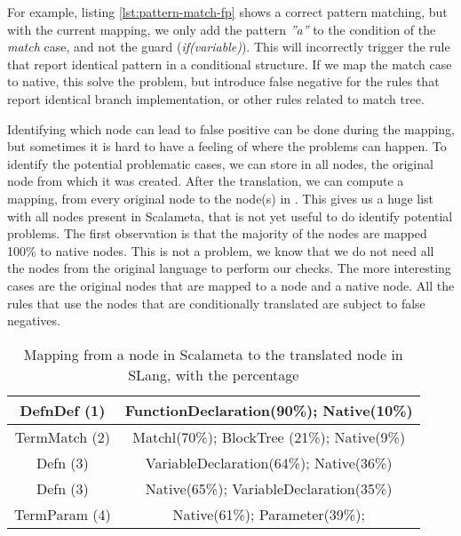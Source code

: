 

For example, listing \ref{lst:pattern-match-fp} shows a correct pattern matching, but with the current mapping, we only add the pattern \emph{”a”} to the condition of the \emph{match} case, and not the guard (\emph{if(variable)}). 
This will incorrectly trigger the rule that report identical pattern in a conditional structure. 
If we map the match case to native, this solve the problem, but introduce false negative for the rules that report identical branch implementation, or other rules related to match tree.

Identifying which node can lead to false positive can be done during the mapping, but sometimes it is hard to have a feeling of where the problems can happen. 
To identify the potential problematic cases, we can store in all nodes, the original node from which it was created. 
After the translation, we can compute a mapping, from every original node to the node(s) in \slang. 
This gives us a huge list with all nodes present in Scalameta, that is not yet useful to do identify potential problems. 
The first observation is that the majority of the nodes are mapped 100\% to native nodes. This is not a problem, we know that we do not need all the nodes from the original language to perform our checks. 
The more interesting cases are the original nodes that are mapped to a \slang{} node and a native node. 
All the rules that use the nodes that are conditionally translated are subject to false negatives.

\begin{table}[h]
	\centering
	\caption{Mapping from a node in Scalameta to the translated node in SLang, with the percentage}
	\label{table:interesting_mapping}
	\begin{tabular}{|c|c|}
		\hline
		DefnDef (1) &  FunctionDeclaration(90\%); Native(10\%) \\ \hline
		TermMatch (2) &  Matchl(70\%); BlockTree (21\%); Native(9\%) \\ \hline
		Defn (3) &  VariableDeclaration(64\%); Native(36\%) \\ \hline
		Defn (3) & Native(65\%); VariableDeclaration(35\%) \\ \hline
		TermParam (4) & Native(61\%); Parameter(39\%); \\ \hline
	\end{tabular}
\end{table}


